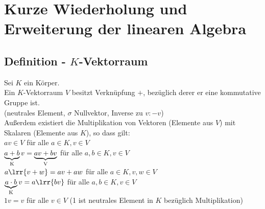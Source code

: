 \newpage
\section{Kurze Wiederholung und Erweiterung der linearen Algebra}
\subsection{Definition - $K$-Vektorraum}
	Sei $K$ ein Körper.\\
	Ein $K$-Vektorraum $V$ besitzt Verknüpfung $+$, bezüglich derer er eine kommutative Gruppe ist.\\
	(neutrales Element, $\sigma$ Nullvektor, Inverse zu $v:-v$)\\
	Außerdem existiert die Multiplikation von Vektoren (Elemente aus $V$) mit Skalaren (Elemente aus $K$), so dass gilt:\\
	$av\in V$ für alle $a\in K, v\in V$\\
	$\underbrace{a+b}_{\mbox{\scriptsize K}}v=\underbrace{av+bv}_{\mbox{\scriptsize V}}$ für alle $a,b\in K, v\in V$\\
	$a\lrr{v+w}=av+aw$ für alle $a\in K,v,w\in V$\\
	$\underbrace{a\cdot b}_{\mbox{\scriptsize K}}v=a\lrr{bv}$ für alle $a,b\in K, v\in V$\\
	$1v=v$ für alle $v\in V$ (1 ist neutrales Element in $K$ bezüglich Multiplikation)

